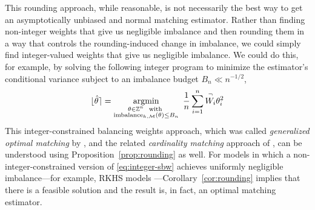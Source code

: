 \documentclass{article}
\DeclareMathOperator*{\argmin}{argmin}
\theoremstyle{definition}
\newtheorem{proposition}[theorem]{Proposition}
\DeclareMathOperator{\Var}{var}
\DeclarePairedDelimiter\round{\lfloor}{\rceil}
\DeclarePairedDelimiter\floor{\lfloor}{\rfloor}
\DeclareMathOperator{\imbalance}{imbalance}
\newcommand{\model}{\mathcal{M}}
\newcommand{\<}{\langle}
\renewcommand{\>}{\rangle}
\begin{document}




This rounding approach, while reasonable, is not necessarily the best way to get an asymptotically unbiased and normal matching estimator.
Rather than finding non-integer weights that give us negligible imbalance and then rounding them in a way that controls the rounding-induced change in imbalance, we could simply find integer-valued weights that give us negligible imbalance.
We could do this, for example, by solving the following integer program to minimize the estimator's conditional variance subject to an imbalance budget $B_n \ll n^{-1/2}$,
\begin{equation}
\label{eq:integer-sbw}
\round{\hat\theta} = \argmin_{\substack{\theta\in\mathbb{Z}^n \ \text{ with } \\ \imbalance_{h, \model}(\theta) \leq B_n}} \  \frac1n\sum_{i=1}^n \overset{\neg}{W_i} \theta_i^2
\end{equation}
This integer-constrained balancing weights approach, which was called \emph{generalized optimal matching} by \citet{kallus2016generalized},
and the related \emph{cardinality matching} approach of \citet{zubizarreta2014matching}, can be understood using Proposition~\ref{prop:rounding} as well. For models in which a non-integer-constrained version of \eqref{eq:integer-sbw} achieves uniformly negligible imbalance---for example, RKHS models \citep[see][and Section~\ref{sec:doing-better}]{hirshberg2019minimax}---Corollary~\ref{cor:rounding} implies that there is a feasible solution and the result is, in fact, an optimal matching estimator.
\end{document}
